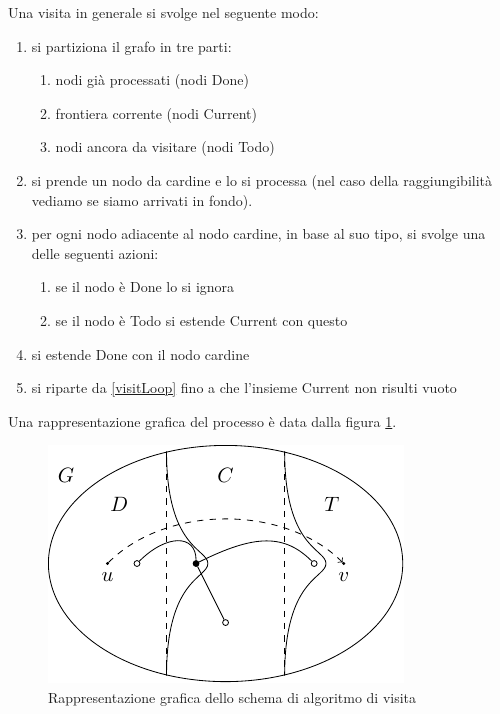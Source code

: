 Una visita in generale si svolge nel seguente modo:
\begin{enumerate}
    \item si partiziona il grafo in tre parti:
    \begin{enumerate}
        \item nodi già processati (nodi Done)
        \item frontiera corrente (nodi Current)
        \item nodi ancora da visitare (nodi Todo)
    \end{enumerate}
    \item\label{visitLoop} si prende un nodo da cardine e lo si processa (nel caso della raggiungibilità vediamo se
    siamo arrivati in fondo).
    \item per ogni nodo adiacente al nodo cardine, in base al suo tipo, si svolge una delle
    seguenti azioni:
    \begin{enumerate}
        \item se il nodo è Done lo si ignora
        \item se il nodo è Todo si estende Current con questo
    \end{enumerate}
    \item si estende Done con il nodo cardine
    \item si riparte da \ref{visitLoop} fino a che l'insieme Current non risulti vuoto
\end{enumerate}

Una rappresentazione grafica del processo è data dalla figura \ref{GraphVisit}.

\begin{figure}[h]
    \begin{center}
        \includegraphics{img/GraphVisit.pdf}
    \end{center}
    \caption{Rappresentazione grafica dello schema di algoritmo di visita}
    \label{GraphVisit}
\end{figure}

